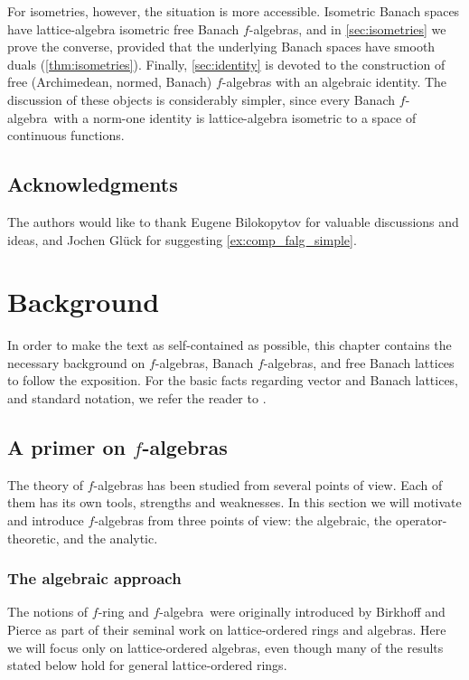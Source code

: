 \documentclass{memo-l}
\theoremstyle{definition}
\theoremstyle{remark}
\numberwithin{section}{chapter}
\numberwithin{equation}{chapter}
\newcommand{\falg}{$f\!$-algebra}
\begin{document}
For isometries, however, the situation is more accessible. Isometric
Banach spaces have lattice-algebra isometric free Banach \falg s, and
in \cref{sec:isometries} we prove the converse, provided that the
underlying Banach spaces have smooth duals (\cref{thm:isometries}).
Finally, \cref{sec:identity} is devoted to the construction of free
(Archimedean, normed, Banach) \falg s with an algebraic identity. The
discussion of these objects is considerably simpler, since every
Banach \falg\ with a norm-one identity is lattice-algebra isometric to
a space of continuous functions.

\section*{Acknowledgments}

The authors would like to thank Eugene Bilokopytov for valuable
discussions and ideas, and Jochen Glück for suggesting
\cref{ex:comp_falg_simple}.


\mainmatter
\chapter{Background}

In order to make the text as self-contained as possible, this chapter
contains the necessary background on \falg s, Banach \falg s, and free
Banach lattices to follow the exposition. For the basic facts
regarding vector and Banach lattices, and standard notation, we refer
the reader to
\cite{aliprantis_burkinshaw2006,lindenstrauss_tzafriri1979,abramovich_aliprantis2002}.


\section{A primer on \falg s}\label{sec:background_falg}

The theory of \falg s has been studied from several points of view.
Each of them has its own tools, strengths and weaknesses. In this
section we will motivate and introduce \falg s from three points of
view: the algebraic, the operator-theoretic, and the analytic.

\subsection{The algebraic approach}

The notions of $f\!$-ring and \falg\ were originally introduced by Birkhoff and
Pierce \cite{birkhoff_pierce1956} as part of their seminal work on
lattice-ordered rings and algebras. Here we will focus only on
lattice-ordered algebras, even though many of the results stated below
hold for general lattice-ordered rings.
\end{document}
